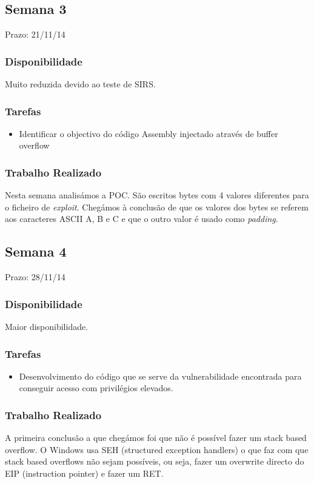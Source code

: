 \documentclass[a4paper]{article}
\begin{document}
\subsection{Semana 3}
Prazo: 21/11/14
\subsubsection{Disponibilidade}
Muito reduzida devido ao teste de SIRS.

\subsubsection{Tarefas}
\begin{itemize}
	\item Identificar o objectivo do código Assembly injectado através de buffer overflow
\end{itemize}

\subsubsection{Trabalho Realizado}

Nesta semana analisámos a POC. São escritos bytes com 4 valores diferentes para o ficheiro de \textit{exploit}. Chegámos à conclusão de que os valores dos bytes se referem aos caracteres ASCII A, B e C e que o outro valor é usado como \textit{padding}.

\subsection{Semana 4}
Prazo: 28/11/14
\subsubsection{Disponibilidade}
Maior disponibilidade.
\subsubsection{Tarefas}
\begin{itemize}
	\item Desenvolvimento do código que se serve da vulnerabilidade encontrada para conseguir acesso com privilégios elevados.
\end{itemize}

\subsubsection{Trabalho Realizado}
A primeira conclusão a que chegámos foi que não é possível fazer um stack based overflow. O Windows usa SEH (structured exception handlers) o que faz com que stack based overflows não sejam possíveis, ou seja, fazer um overwrite directo do EIP (instruction pointer) e fazer um RET.
\end{document}
